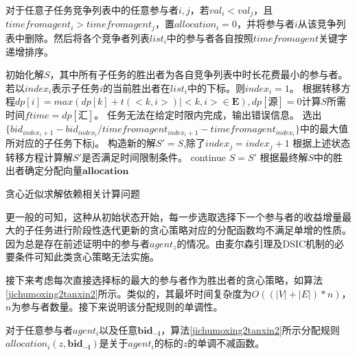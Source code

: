 \documentclass[promaster]{thesis-uestc}
\begin{document}
\begin{algorithm}[h]
    对于任意子任务竞争列表中的任意参与者$i,j$，若$val_i < val_j$，且$timefromagent_i > timefromagent_j$，置$allocation_i = 0$，并将参与者$i$从该竞争列表中删除。然后将各个竞争者列表$list_i$中的参与者各自按照$timefromagent$关键字递增排序。\;

    初始化解$S$，其中所有子任务的胜出者为各自竞争列表中时长花费最小的参与者。\;
    若以$index_i$表示子任务$i$的当前胜出者在$list_i$中的下标。则$index_i = 1$。\;
    根据转移方程$dp[i] = max(dp[k]+t(<k,i>)|<k,i> \in \mathbf{E}),dp[\text{源}] = 0$计算$S$所需时间$ftime = dp[\text{汇}]$。\;
    {
        任务无法在给定时限内完成，输出错误信息。\;
    }
    {
        选出$\{bid_{index_i+1}-bid_{index_i}/timefromagent_{index_i+1}-timefromagent_{index_i}\}$中的最大值所对应的子任务下标j。\;
        构造新的解$S' = S$,除了$index_j = index_j+1$\;
        根据上述状态转移方程计算解$S'$是否满足时间限制条件。\;
        {
            continue\;
        }
        $S = S'$\;
    } 
    根据最终解$S$中的胜出者确定分配向量$\mathbf{allocation}$\;
\caption{贪心近似求解依赖相关计算问题}
\label{jichumoxing2tanxin}
\end{algorithm}

更一般的可知，这种从初始状态开始，每一步选取选择下一个参与者的收益增量最大的子任务进行阶段性迭代更新的贪心策略对应的分配函数均不满足单增的性质。因为总是存在前述证明中的参与者$agent_z$的情况。由麦尔森引理及DSIC机制的必要条件可知此类贪心策略无法实施。

接下来考虑每次直接选择标的最大的参与者作为胜出者的贪心策略，如算法\ref{jichumoxing2tanxin2}所示。类似的，其最坏时间复杂度为$O((|V|+|E|)*n)$，$n$为参与者数量。接下来说明该分配规则的单调性。

\begin{theorem}
对于任意参与者$agent_i$以及任意$\mathbf{bid_{-i}}$，算法\ref{jichumoxing2tanxin2}所示分配规则$allocation_i(z,\mathbf{bid_{-i}})$是关于$agent_i$的标的$z$的单调不减函数。
\end{theorem}
\end{document}
